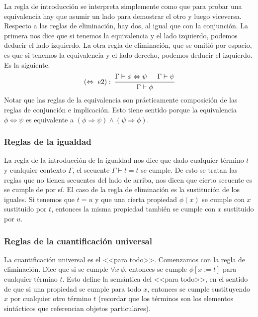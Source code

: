 \documentclass[a4paper, 12pt]{report}
\newcommand{\Ra}{\Rightarrow}
\newcommand{\te}{\text}
\newcommand{\Lra}{\Leftrightarrow}
\theoremstyle{definition}
\begin{document}
La regla de introducción se interpreta simplemente como que para probar una equivalencia hay que asumir un lado para demostrar el otro y luego viceversa. Respecto a las reglas de eliminación, hay dos, al igual que con la conjunción. La primera nos dice que si tenemos la equivalencia y el lado izquierdo, podemos deducir el lado izquierdo. La otra regla de eliminación, que se omitió por espacio, es que si tenemos la equivalencia y el lado derecho, podemos deducir el izquierdo. Es la siguiente.
$$(\Lra\te{ e2}):~\begin{prooftree}
	\hypo{\Gamma\vdash\phi\Lra\psi}\hypo{\Gamma\vdash\psi}
	\infer2{\Gamma\vdash\phi}\end{prooftree}
$$
Notar que las reglas de la equivalencia son prácticamente composición de las reglas de conjunción e implicación. Esto tiene sentido porque la equivalencia $\phi\Lra\psi$ es equivalente a $(\phi\Ra\psi)\wedge(\psi\Ra\phi)$.

\subsubsection{Reglas de la igualdad}

La regla de la introducción de la igualdad nos dice que dado cualquier término $t$ y cualquier contexto $\Gamma$, el secuente $\Gamma\vdash t=t$ se cumple. De esto se tratan las reglas que no tienen secuentes del lado de arriba, nos dicen que cierto secuente es se cumple de por sí. El caso de la regla de eliminación es la sustitución de los iguales. Si tenemos que $t=u$ y que una cierta propiedad $\phi(x)$ se cumple con $x$ sustituido por $t$, entonces la misma propiedad también se cumple con $x$ sustituido por $u$.

\subsubsection{Reglas de la cuantificación universal}

La cuantificación universal es el <<para todo>>. Comenzamos con la regla de eliminación. Dice que si se cumple $\forall x~\phi$, entonces se cumple $\phi[x:=t]$ para cualquier término $t$. Esto define la semántica del <<para todo>>, en el sentido de que si una propiedad se cumple para todo $x$, entonces se cumple sustituyendo $x$ por cualquier otro término $t$ (recordar que los términos son los elementos sintácticos que referencian objetos particulares).
\end{document}
